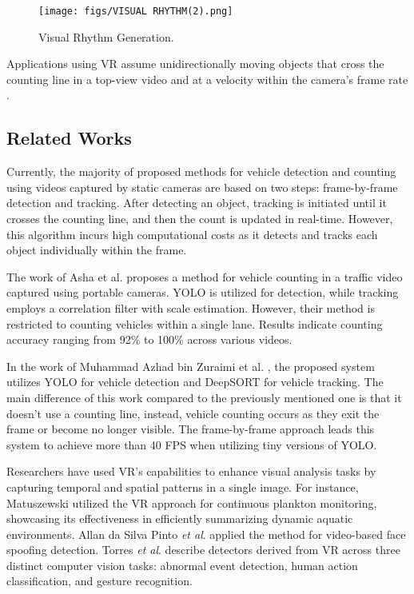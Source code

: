 \documentclass[10pt,conference]{IEEEtran}
\begin{document}
\begin{figure}[htp]
    \centering
    \texttt{[image: figs/VISUAL RHYTHM(2).png]}
    \caption{Visual Rhythm Generation.}
    \label{fig:vr-generation}
\end{figure}

Applications using VR assume unidirectionally moving objects that cross the counting line in a top-view video and at a velocity within the camera's frame rate \cite{VR-plankton}.

\subsection{Related Works}
Currently, the majority of proposed methods for vehicle detection and counting using videos captured by static cameras are based on two steps: frame-by-frame detection and tracking. After detecting an object, tracking is initiated until it crosses the counting line, and then the count is updated in real-time. However, this algorithm incurs high computational costs as it detects and tracks each object individually within the frame. 

The work of Asha et al. \cite{Correlation} proposes a method for vehicle counting in a traffic video captured using portable cameras. YOLO is utilized for detection, while tracking employs a correlation filter with scale estimation. However, their method is restricted to counting vehicles within a single lane. Results indicate counting accuracy ranging from 92\% to 100\% across various videos.

In the work of Muhammad Azhad bin Zuraimi et al. \cite{DeepSORT}, the proposed system utilizes YOLO for vehicle detection and DeepSORT for vehicle tracking. The main difference of this work compared to the previously mentioned one is that it doesn't use a counting line, instead, vehicle counting occurs as they exit the frame or become no longer visible. The frame-by-frame approach leads this system to achieve more than 40 FPS when utilizing tiny versions of YOLO.

Researchers have used VR's capabilities to enhance visual analysis tasks by capturing temporal and spatial patterns in a single image. For instance, Matuszewski \cite{VR-plankton} utilized the VR approach for continuous plankton monitoring, showcasing its effectiveness in efficiently summarizing dynamic aquatic environments. Allan da Silva Pinto \emph{et al}. \cite{VR-definition} applied the method for video-based face spoofing detection. Torres \emph{et al}. \cite{vr-many} describe detectors derived from VR across three distinct computer vision tasks: abnormal event detection, human action classification, and gesture recognition.
\end{document}
